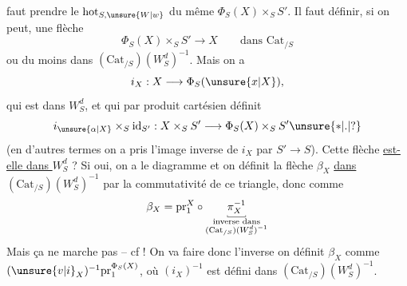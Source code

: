 faut prendre le $\mathrm{hot}_{S,\unsure{W|w}}$ du même $\Phi_S(X)\times_S S'$.  Il faut définir, si on peut, une flèche
\[
 \Phi_S(X)\times_S S'\longrightarrow X\qquad\text{dans }\mathrm{Cat}_{/S}
\]
ou du moins dans $(\mathrm{Cat}_{/S})(W_S^d)^{-1}$.  Mais on a
\[
 i_X:X\longrightarrow\Phi_S(\unsure{x|X}),
\]
qui est dans $W_S^d$, et qui par produit cartésien définit
\[
 i_{\unsure{\alpha|X}}\times_S\mathrm{id}_{S'}:X\times_S S'\longrightarrow\Phi_S(X)\times_S S'\unsure{*|.|?}
\]
(en d'autres termes on a pris l'image inverse de $i_X$ par $S'\longrightarrow S$).  Cette  flèche \uline{est-elle  dans $W_S^d$} ?
Si oui, on a le diagramme
et on définit la flèche  $\beta_X$ \uline{dans $(\mathrm{Cat}_{/S})(W_S^d)^{-1}$} par la commutativité de ce triangle, donc comme
\[
 \beta_X=\mathrm{pr}_1^X\circ\underset{\substack{\rule{.35pt}{.4ex}\rule{1.6em}{.35pt}\rule{.35pt}{.4ex}\\\text{inverse dans}\\(\mathrm{Cat}_{/S})(W_S^d)^{-1}}}{\pi_X^{-1}}
\]
Mais ça ne marche pas -- cf  ! On va faire donc l'inverse
on définit $\beta_X$ comme $(\unsure{v|i}_X)^{-1}\mathrm{pr}_1^{\Phi_S(X)}$, où $(i_X)^{-1}$ est défini dans $(\mathrm{Cat}_{/S})(W_S^d)^{-1}$.

